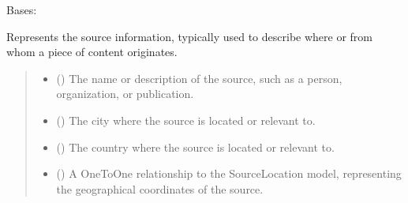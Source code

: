 \documentclass[letterpaper,10pt,english]{sphinxmanual}
\begin{document}
\begin{fulllineitems}
\label{\detokenize{source/meta_models_management:meta_models_management.models.SourceInfo}}
\pysigstartsignatures
{}
\pysigstopsignatures
\sphinxAtStartPar
Bases: 

\sphinxAtStartPar
Represents the source information, typically used to describe where or from whom a piece of content originates.
\begin{quote}\begin{description}
\begin{itemize}
\item {} 
\sphinxAtStartPar
{} () \textendash{} The name or description of the source, such as a person, organization, or publication.

\item {} 
\sphinxAtStartPar
{} () \textendash{} The city where the source is located or relevant to.

\item {} 
\sphinxAtStartPar
{} () \textendash{} The country where the source is located or relevant to.

\item {} 
\sphinxAtStartPar
{} () \textendash{} A OneToOne relationship to the SourceLocation model, representing the geographical coordinates of the source.

\end{itemize}

\end{description}\end{quote}


\end{fulllineitems}
\end{document}
